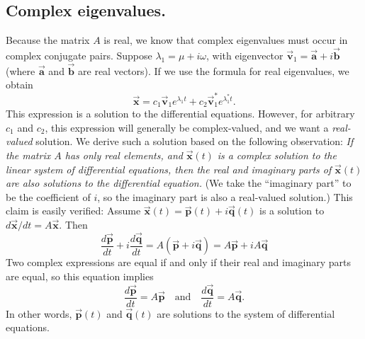 \documentclass[reqno]{immbook}
\newcommand{\BA}{\vec{\textbf{a}}}
\newcommand{\BB}{\vec{\textbf{b}}}
\newcommand{\BP}{\vec{\textbf{p}}}
\newcommand{\BQ}{\vec{\textbf{q}}}
\newcommand{\BV}{\vec{\textbf{v}}}
\newcommand{\BX}{\vec{\textbf{x}}}
\numberwithin{equation}{chapter}
\numberwithin{question}{section}
\numberwithin{theorem}{chapter}
\numberwithin{figure}{chapter}
\theoremstyle{definition}
\begin{document}
\subsection*{Complex eigenvalues.}
Because the matrix $A$ is real, we know that complex eigenvalues must
occur in complex conjugate pairs.
Suppose $\lambda_1 = \mu + i\omega$, with eigenvector
$\BV_1=\BA+i\BB$ (where $\BA$ and $\BB$ are real vectors).
If we use the formula for real eigenvalues,
we obtain
\begin{equation}
 \BX = c_1 \BV_1 e^{\lambda_1 t} + c_2 \BV_1^* e^{\lambda_1^* t}. 
\end{equation}
This expression is a solution to the differential equations.
However, for arbitrary $c_1$ and $c_2$, this expression will
generally be complex-valued, and we want a \emph{real-valued}
solution.
We derive such a solution based on the following observation:
\emph{If the matrix $A$ has only real elements, and} $\BX(t)$
\emph{is a complex solution to the linear system of differential equations,
then the real and imaginary parts of} $\BX(t)$
\emph{are also solutions
to the differential equation.}  (We take the ``imaginary part''
to be the coefficient of $i$, so the imaginary part is also
a real-valued solution.)  This claim is easily verified:
Assume $\BX(t) = \BP(t) + i \BQ(t)$ is a solution to
$d\BX/dt = A\BX$.  Then
\begin{equation}
  \frac{d\BP}{dt} + i\frac{d\BQ}{dt} = A(\BP+i\BQ) = A\BP + iA\BQ
\end{equation}
Two complex expressions are equal if and only if their real
and imaginary parts are equal, so this equation implies
\begin{equation}
  \frac{d\BP}{dt} = A\BP \quad \textrm{and} \quad
  \frac{d\BQ}{dt} = A\BQ.
\end{equation}
In other words, $\BP(t)$ and $\BQ(t)$ are solutions
to the system of differential equations.
\end{document}
